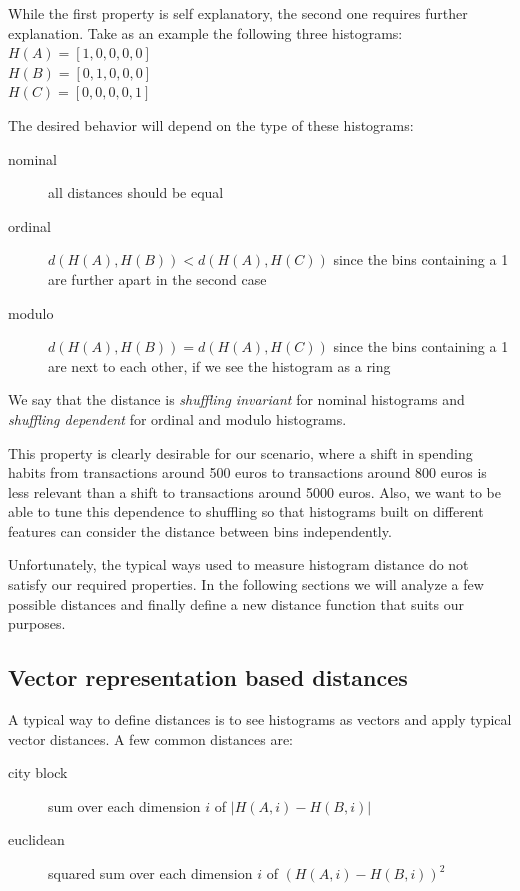 While the first property is self explanatory, the second one requires further explanation. Take as an example the following three histograms:\\
$H(A) = [1, 0, 0, 0, 0]$\\
$H(B) = [0, 1, 0, 0, 0]$\\
$H(C) = [0, 0, 0, 0, 1]$

The desired behavior will depend on the type of these histograms:
\begin{description}
  \item[nominal] all distances should be equal
  \item[ordinal] $d(H(A), H(B)) < d(H(A), H(C))$ since the bins containing a 1 are further apart in the second case
  \item[modulo] $d(H(A), H(B)) = d(H(A), H(C))$ since the bins containing a 1 are next to each other, if we see the histogram as a ring
\end{description}

We say that the distance is \textit{shuffling invariant} for nominal histograms and \textit{shuffling dependent} for ordinal and modulo histograms.

This property is clearly desirable for our scenario, where a shift in spending habits from transactions around 500 euros to transactions around 800 euros is less relevant than a shift to transactions around 5000 euros. Also, we want to be able to tune this dependence to shuffling so that histograms built on different features can consider the distance between bins independently.

Unfortunately, the typical ways used to measure histogram distance do not satisfy our required properties. In the following sections we will analyze a few possible distances and finally define a new distance function that suits our purposes.

\subsection{Vector representation based distances}

A typical way to define distances is to see histograms as vectors and apply typical vector distances. A few common distances are:
\begin{description}
  \item[city block] sum over each dimension $i$ of $|H(A,i) - H(B,i)|$
  \item[euclidean] squared sum over each dimension $i$ of $(H(A,i) - H(B,i))^2$
\end{description}

